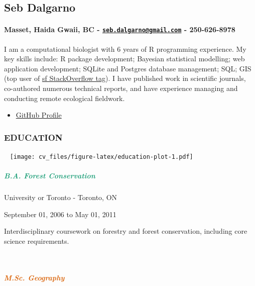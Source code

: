 \documentclass[
]{article}
\author{Seb Dalgarno}
\date{2018-10-14}
\providecommand{\tightlist}{%
  \setlength{\itemsep}{0pt}\setlength{\parskip}{0pt}}
\begin{document}
\hypertarget{seb-dalgarno}{%
\subsection{Seb Dalgarno}\label{seb-dalgarno}}

\hypertarget{masset-haida-gwaii-bc---seb.dalgarnogmail.com---250-626-8978}{%
\paragraph{\texorpdfstring{Masset, Haida Gwaii, BC -
\href{mailto:seb.dalgarno@gmail.com}{\nolinkurl{seb.dalgarno@gmail.com}}
-
250-626-8978}{Masset, Haida Gwaii, BC - seb.dalgarno@gmail.com - 250-626-8978}}\label{masset-haida-gwaii-bc---seb.dalgarnogmail.com---250-626-8978}}

I am a computational biologist with 6 years of R programming experience.
My key skills include: R package development; Bayesian statistical
modelling; web application development; SQLite and Postgres database
management; SQL; GIS (top user of
\href{https://stackoverflow.com/tags/sf/topusers}{sf StackOverflow
tag}). I have published work in scientific journals, co-authored
numerous technical reports, and have experience managing and conducting
remote ecological fieldwork.

\begin{itemize}
\tightlist
\item
  \href{https://github.com/sebdalgarno}{GitHub Profile} \\
\end{itemize}

\hypertarget{education}{%
\subsubsection{EDUCATION}\label{education}}

~ \texttt{[image: cv\_files/figure-latex/education-plot-1.pdf]}

\hypertarget{section}{%
\subparagraph{\texorpdfstring{\textcolor{#1B9E77}{B.A. Forest Conservation}}{}}\label{section}}

University or Toronto - Toronto, ON

September 01, 2006 to May 01, 2011

Interdisciplinary coursework on forestry and forest conservation,
including core science requirements.

~

\hypertarget{section-1}{%
\subparagraph{\texorpdfstring{\textcolor{#D95F02}{M.Sc. Geography}}{}}\label{section-1}}
\end{document}
